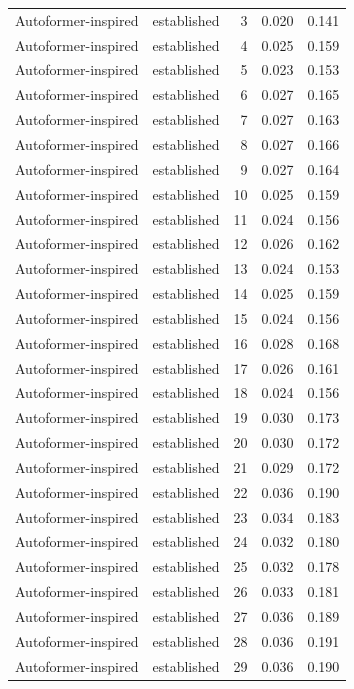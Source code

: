 \begin{tabular}{llrrr}
Autoformer-inspired & established & 3 & 0.020 & 0.141 \\
Autoformer-inspired & established & 4 & 0.025 & 0.159 \\
Autoformer-inspired & established & 5 & 0.023 & 0.153 \\
Autoformer-inspired & established & 6 & 0.027 & 0.165 \\
Autoformer-inspired & established & 7 & 0.027 & 0.163 \\
Autoformer-inspired & established & 8 & 0.027 & 0.166 \\
Autoformer-inspired & established & 9 & 0.027 & 0.164 \\
Autoformer-inspired & established & 10 & 0.025 & 0.159 \\
Autoformer-inspired & established & 11 & 0.024 & 0.156 \\
Autoformer-inspired & established & 12 & 0.026 & 0.162 \\
Autoformer-inspired & established & 13 & 0.024 & 0.153 \\
Autoformer-inspired & established & 14 & 0.025 & 0.159 \\
Autoformer-inspired & established & 15 & 0.024 & 0.156 \\
Autoformer-inspired & established & 16 & 0.028 & 0.168 \\
Autoformer-inspired & established & 17 & 0.026 & 0.161 \\
Autoformer-inspired & established & 18 & 0.024 & 0.156 \\
Autoformer-inspired & established & 19 & 0.030 & 0.173 \\
Autoformer-inspired & established & 20 & 0.030 & 0.172 \\
Autoformer-inspired & established & 21 & 0.029 & 0.172 \\
Autoformer-inspired & established & 22 & 0.036 & 0.190 \\
Autoformer-inspired & established & 23 & 0.034 & 0.183 \\
Autoformer-inspired & established & 24 & 0.032 & 0.180 \\
Autoformer-inspired & established & 25 & 0.032 & 0.178 \\
Autoformer-inspired & established & 26 & 0.033 & 0.181 \\
Autoformer-inspired & established & 27 & 0.036 & 0.189 \\
Autoformer-inspired & established & 28 & 0.036 & 0.191 \\
Autoformer-inspired & established & 29 & 0.036 & 0.190 \\

\end{tabular}
